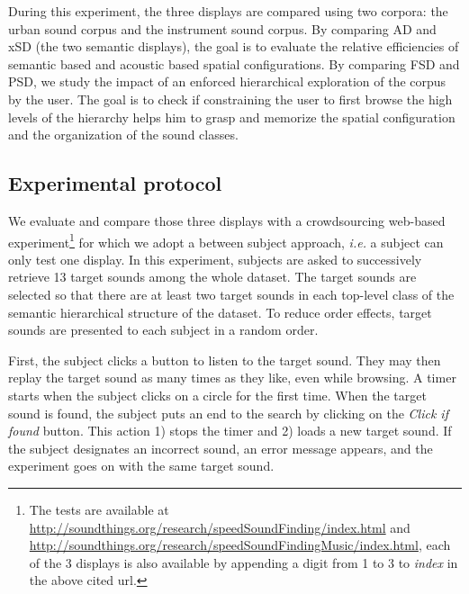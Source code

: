 \documentclass{aes2e}
\begin{document}
During this experiment, the three displays are compared using two corpora: the urban sound corpus and the instrument sound corpus. By comparing AD and xSD (the two semantic displays), the goal is to evaluate the  relative efficiencies of semantic based and acoustic based spatial configurations. By comparing FSD and PSD, we study the impact of an enforced hierarchical exploration of the corpus by the user. The goal is to check if constraining the user to first browse the high levels of the hierarchy helps him to grasp and memorize the spatial configuration and the organization of the sound classes. 

\subsection{Experimental protocol}

We evaluate and compare those three displays with a crowdsourcing web-based experiment\footnote{The tests are available at \url{http://soundthings.org/research/speedSoundFinding/index.html} and \url{http://soundthings.org/research/speedSoundFindingMusic/index.html}, each of the 3 displays is also available by appending a digit from 1 to 3 to \textit{index} in the above cited url.} for which we adopt a between subject approach, \textit{i.e.} a subject can only test one display. In this experiment, subjects are asked to successively retrieve 13 target sounds among the whole dataset. The target sounds are selected so that there are at least two target sounds in each top-level class of the semantic hierarchical structure of the dataset. To reduce order effects, target sounds are presented to each subject in a random order.

First, the subject clicks a button to listen to the target sound. They may then replay the target sound as many times as they like, even while browsing. A timer starts when the subject clicks on a circle for the first time. When the target sound is found, the subject puts an end to the search by clicking on the \textit{Click if found} button. This action 1) stops the timer and 2) loads a new target sound. If the subject designates an incorrect sound, an error message appears, and the experiment goes on with the same target sound.


\end{document}
